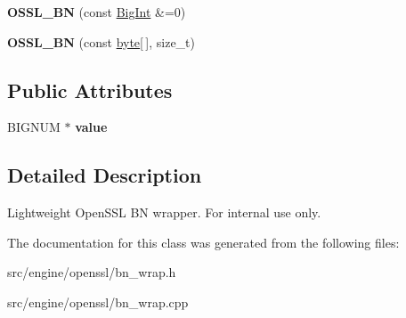 \begin{DoxyCompactItemize}
\item 
\hypertarget{classBotan_1_1OSSL__BN_a1558aeafb87d62e8f5d0c60675d6110a}{{\bfseries O\-S\-S\-L\-\_\-\-B\-N} (const \hyperlink{classBotan_1_1BigInt}{Big\-Int} \&=0)}\label{classBotan_1_1OSSL__BN_a1558aeafb87d62e8f5d0c60675d6110a}

\item 
\hypertarget{classBotan_1_1OSSL__BN_a1b1b76c2502f9c52a59569b534e2a5bc}{{\bfseries O\-S\-S\-L\-\_\-\-B\-N} (const \hyperlink{namespaceBotan_a7d793989d801281df48c6b19616b8b84}{byte}\mbox{[}$\,$\mbox{]}, size\-\_\-t)}\label{classBotan_1_1OSSL__BN_a1b1b76c2502f9c52a59569b534e2a5bc}

\end{DoxyCompactItemize}
\subsection*{Public Attributes}
\begin{DoxyCompactItemize}
\item 
\hypertarget{classBotan_1_1OSSL__BN_a8c81e9ef3273091d70f4d8ab29338f8d}{B\-I\-G\-N\-U\-M $\ast$ {\bfseries value}}\label{classBotan_1_1OSSL__BN_a8c81e9ef3273091d70f4d8ab29338f8d}

\end{DoxyCompactItemize}


\subsection{Detailed Description}
Lightweight Open\-S\-S\-L B\-N wrapper. For internal use only. 

The documentation for this class was generated from the following files\-:\begin{DoxyCompactItemize}
\item 
src/engine/openssl/bn\-\_\-wrap.\-h\item 
src/engine/openssl/bn\-\_\-wrap.\-cpp\end{DoxyCompactItemize}
